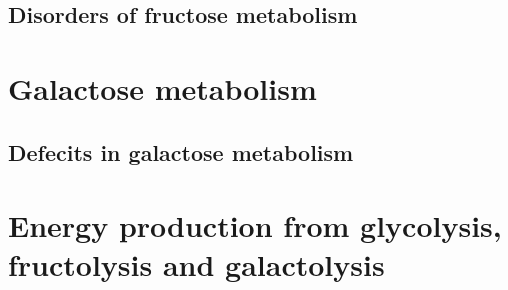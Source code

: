 \documentclass{tufte-handout}
\begin{document}
\subsection{Disorders of fructose metabolism}
\section{Galactose metabolism}
\subsection{Defecits in galactose metabolism}
\section{Energy production from glycolysis, fructolysis and galactolysis}


\end{document}
